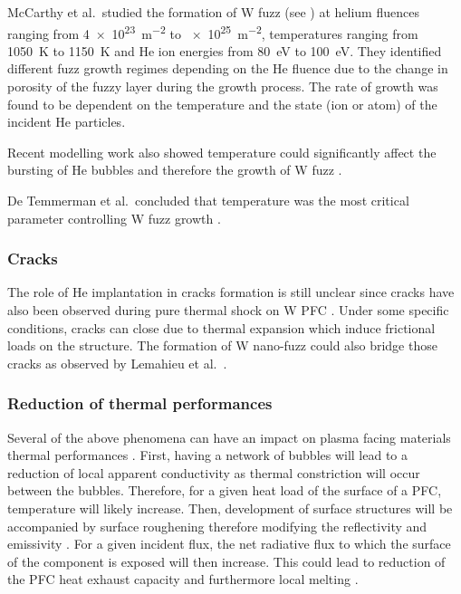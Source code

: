 McCarthy et al.\ studied the formation of \gls{W} \gls{fuzz} (see ) at helium fluences ranging from \SI{4e23}{m^{-2}} to \SI{e25}{m^{-2}}, temperatures ranging from \SI{1050}{K} to \SI{1150}{K} and \gls{He} ion energies from \SI{80}{eV} to \SI{100}{eV}.
They identified different \gls{fuzz} growth regimes depending on the \gls{He} \gls{fluence} due to the change in porosity of the fuzzy layer during the growth process.
The rate of growth was found to be dependent on the temperature and the state (ion or atom) of the incident \gls{He} particles.

Recent modelling work also showed temperature could significantly affect the bursting of \gls{He} bubbles and therefore the growth of \gls{W} \gls{fuzz} .

De Temmerman et al.\ concluded that temperature was the most critical parameter controlling \gls{W} \gls{fuzz} growth .

\subsubsection{Cracks}

The role of \gls{He} implantation in cracks formation is still unclear since cracks have also been observed during pure thermal shock on \gls{W} PFC .
Under some specific conditions, cracks can close due to thermal expansion which induce frictional loads on the structure.
The formation of \gls{W} nano-fuzz could also bridge those cracks as observed by Lemahieu et al.\ .

\subsubsection{Reduction of thermal performances}

Several of the above phenomena can have an impact on \gls{plasma} facing materials thermal performances .
First, having a network of bubbles will lead to a reduction of local apparent conductivity as thermal constriction will occur between the bubbles.
Therefore, for a given heat load of the surface of a PFC, temperature will likely increase.
Then, development of surface structures will be accompanied by surface roughening therefore modifying the reflectivity and emissivity .
For a given incident flux, the net radiative flux to which the surface of the component is exposed will then increase.
This could lead to reduction of the PFC heat exhaust capacity and furthermore local melting .

